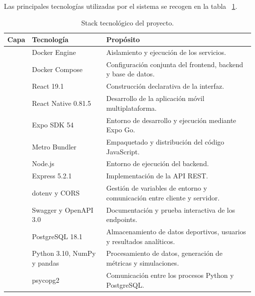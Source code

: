 Las principales tecnolog\'ias utilizadas por el sistema se recogen en la tabla ~\ref{tab:stack-tecnologico}.
\begin{table}[H]
\centering
\caption{Stack tecnológico del proyecto.}
\label{tab:stack-tecnologico}
\renewcommand{\arraystretch}{1.2}
\begin{tabular}{|>{\centering\arraybackslash}m{3.2cm}|p{4.2cm}|p{6cm}|}
\hline
\textbf{Capa} & \textbf{Tecnología} & \textbf{Propósito} \\
\hline

\multirow[c]{2}{3.2cm}{\centering Contenerización} 
& Docker Engine & Aislamiento y ejecución de los servicios. \\ \cline{2-3}
& Docker Compose & Configuración conjunta del frontend, backend y base de datos. \\
\hline

\multirow[c]{4}{3.2cm}{\centering Cliente} 
& React 19.1 & Construcción declarativa de la interfaz. \\ \cline{2-3}
& React Native 0.81.5 & Desarrollo de la aplicación móvil multiplataforma. \\ \cline{2-3}
& Expo SDK 54 & Entorno de desarrollo y ejecución mediante Expo Go. \\ \cline{2-3}
& Metro Bundler & Empaquetado y distribución del código JavaScript. \\
\hline

\multirow[c]{3}{3.2cm}{\centering Servidor} 
& Node.js & Entorno de ejecución del backend. \\ \cline{2-3}
& Express 5.2.1 & Implementación de la API REST. \\ \cline{2-3}
& dotenv y CORS & Gestión de variables de entorno y comunicación entre cliente y servidor. \\ \cline{2-3}
& Swagger y OpenAPI 3.0 & Documentación y prueba interactiva de los endpoints. \\ \cline{2-3}
& PostgreSQL 18.1 & Almacenamiento de datos deportivos, usuarios y resultados analíticos. \\
\hline

\multirow[c]{2}{3.2cm}{\centering Analítica} 
& Python 3.10, NumPy y pandas & Procesamiento de datos, generación de métricas y simulaciones. \\ \cline{2-3}
& psycopg2 & Comunicación entre los procesos Python y PostgreSQL. \\
\hline

\end{tabular}
\end{table}
